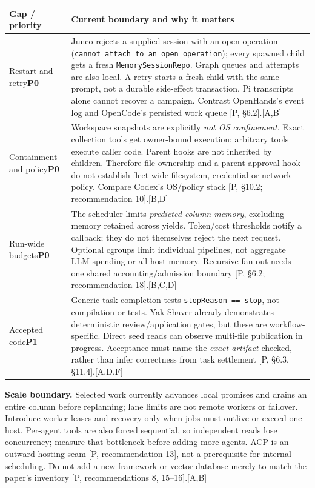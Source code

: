 \documentclass[10pt,a4paper]{article}
\newcommand{\heading}[1]{\par\vspace{5pt}{\large\bfseries\color{ink}#1}\par\vspace{2pt}}
\newcommand{\src}[1]{\textcolor{accent}{\scriptsize[#1]}}
\begin{document}
\heading{The consequential shortfalls}
{\small
\renewcommand{\arraystretch}{1.12}
\begin{tabularx}{\linewidth}{@{}>{\raggedright\arraybackslash}p{27mm}Y@{}}
\toprule
\textbf{Gap / priority} & \textbf{Current boundary and why it matters}\\
\midrule
Restart and retry\newline\textbf{P0} & Junco rejects a supplied session with an open operation (\texttt{cannot attach to an open operation}); every spawned child gets a fresh \texttt{MemorySessionRepo}. Graph queues and attempts are also local. A retry starts a fresh child with the same prompt, not a durable side-effect transaction. Pi transcripts alone cannot recover a campaign. Contrast OpenHands's event log and OpenCode's persisted work queue [P, \S6.2].\src{A,B}\\
\addlinespace[3pt]
Containment and policy\newline\textbf{P0} & Workspace snapshots are explicitly \emph{not OS confinement}. Exact collection tools get owner-bound execution; arbitrary tools execute caller code. Parent hooks are not inherited by children. Therefore file ownership and a parent approval hook do not establish fleet-wide filesystem, credential or network policy. Compare Codex's OS/policy stack [P, \S10.2; recommendation 10].\src{B,D}\\
\addlinespace[3pt]
Run-wide budgets\newline\textbf{P0} & The scheduler limits \emph{predicted column memory}, excluding memory retained across yields. Token/cost thresholds notify a callback; they do not themselves reject the next request. Optional cgroups limit individual pipelines, not aggregate LLM spending or all host memory. Recursive fan-out needs one shared accounting/admission boundary [P, \S6.2; recommendation 18].\src{B,C,D}\\
\addlinespace[3pt]
Accepted code\newline\textbf{P1} & Generic task completion tests \texttt{stopReason == stop}, not compilation or tests. Yak Shaver already demonstrates deterministic review/application gates, but these are workflow-specific. Direct seed reads can observe multi-file publication in progress. Acceptance must name the \emph{exact artifact} checked, rather than infer correctness from task settlement [P, \S6.3, \S11.4].\src{A,D,F}\\
\bottomrule
\end{tabularx}}

\textbf{Scale boundary.} Selected work currently advances local promises and drains an entire column before replanning; lane limits are not remote workers or failover. Introduce worker leases and recovery only when jobs must outlive or exceed one host. Per-agent tools are also forced sequential, so independent reads lose concurrency; measure that bottleneck before adding more agents. ACP is an outward hosting seam [P, recommendation 13], not a prerequisite for internal scheduling. Do not add a new framework or vector database merely to match the paper's inventory [P, recommendations 8, 15--16].\src{A,B}
\end{document}

